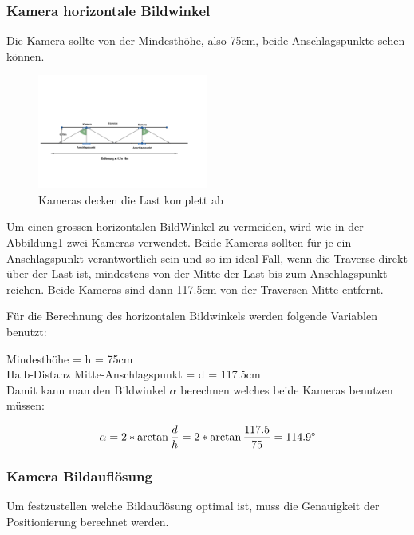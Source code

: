 \subsubsection{Kamera horizontale Bildwinkel}

Die Kamera sollte von der Mindesthöhe, also 75cm, beide Anschlagspunkte sehen können.

\begin{figure}[H]
    \centering
    \includegraphics[width=0.5\textwidth]{graphics/KameraFOV.png}\hfill%
    \caption{Kameras decken die Last komplett ab}
    \label{fig:FOV}
\end{figure}

Um einen grossen horizontalen BildWinkel zu vermeiden, wird wie in der Abbildung\ref{fig:FOV} zwei Kameras verwendet. 
Beide Kameras sollten für je ein Anschlagspunkt verantwortlich sein und so im ideal Fall, wenn die Traverse direkt über der Last ist, mindestens von der Mitte der Last bis zum Anschlagspunkt reichen.
Beide Kameras sind dann 117.5cm von der Traversen Mitte entfernt.

Für die Berechnung des horizontalen Bildwinkels werden folgende Variablen benutzt:

Mindesthöhe = h = 75cm\\
Halb-Distanz Mitte-Anschlagspunkt = d = 117.5cm\\

Damit kann man den Bildwinkel \(\alpha\) berechnen welches beide Kameras benutzen müssen:

\begin{equation}
    \alpha = 2*\arctan\frac{d}{h} = 2*\arctan\frac{117.5}{75} = 114.9\degree
    \label{eq:FOV}
\end{equation}


\subsubsection{Kamera Bildauflösung}
Um festzustellen welche Bildauflösung optimal ist, muss die Genauigkeit der Positionierung berechnet werden.

